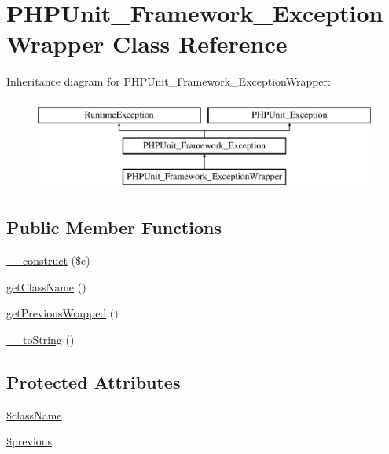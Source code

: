 \hypertarget{class_p_h_p_unit___framework___exception_wrapper}{}\section{P\+H\+P\+Unit\+\_\+\+Framework\+\_\+\+Exception\+Wrapper Class Reference}
\label{class_p_h_p_unit___framework___exception_wrapper}
Inheritance diagram for P\+H\+P\+Unit\+\_\+\+Framework\+\_\+\+Exception\+Wrapper\+:\begin{figure}[H]
\begin{center}
\leavevmode
\includegraphics[height=3.000000cm]{class_p_h_p_unit___framework___exception_wrapper}
\end{center}
\end{figure}
\subsection*{Public Member Functions}
\begin{DoxyCompactItemize}
\item 
\mbox{\hyperlink{class_p_h_p_unit___framework___exception_wrapper_a8bc6f81fd93ac33e9209747b8dcf04e7}{\+\_\+\+\_\+construct}} (\$e)
\item 
\mbox{\hyperlink{class_p_h_p_unit___framework___exception_wrapper_ab8f8ee56588ebf5091c288e44ebdfaf4}{get\+Class\+Name}} ()
\item 
\mbox{\hyperlink{class_p_h_p_unit___framework___exception_wrapper_a4b21dfeb60d00f48aa275f885cac07be}{get\+Previous\+Wrapped}} ()
\item 
\mbox{\hyperlink{class_p_h_p_unit___framework___exception_wrapper_a7516ca30af0db3cdbf9a7739b48ce91d}{\+\_\+\+\_\+to\+String}} ()
\end{DoxyCompactItemize}
\subsection*{Protected Attributes}
\begin{DoxyCompactItemize}
\item 
\mbox{\hyperlink{class_p_h_p_unit___framework___exception_wrapper_acd6a475a6eeb092f4eea3e19e502d67d}{\$class\+Name}}
\item 
\mbox{\hyperlink{class_p_h_p_unit___framework___exception_wrapper_a4774a105bfb14b9d24aa2357408f32f8}{\$previous}}
\end{DoxyCompactItemize}



